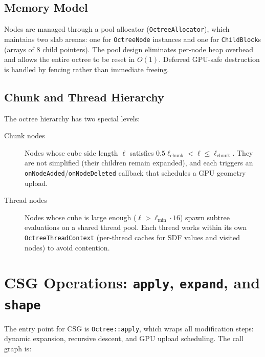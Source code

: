 \documentclass[10pt,a4paper]{article}
\begin{document}
\subsection{Memory Model}

Nodes are managed through a pool allocator (\lstinline{OctreeAllocator}),
which maintains two slab arenas: one for \lstinline{OctreeNode} instances
and one for \lstinline{ChildBlock}s (arrays of 8 child pointers).
The pool design eliminates per-node heap overhead and allows the entire
octree to be reset in $O(1)$.  Deferred GPU-safe destruction is handled
by fencing rather than immediate freeing.

\subsection{Chunk and Thread Hierarchy}

The octree hierarchy has two special levels:
\begin{description}
  \item[Chunk nodes] Nodes whose cube side length $\ell$ satisfies
    $0.5\ell_{\mathrm{chunk}} < \ell \leq \ell_{\mathrm{chunk}}$.
    They are not simplified (their children remain expanded), and each
    triggers an \lstinline{onNodeAdded}/\lstinline{onNodeDeleted}
    callback that schedules a GPU geometry upload.
  \item[Thread nodes] Nodes whose cube is large enough
    ($\ell > \ell_{\min} \cdot 16$) spawn subtree evaluations on a
    shared thread pool.  Each thread works within its own
    \lstinline{OctreeThreadContext} (per-thread caches for SDF values and
    visited nodes) to avoid contention.
\end{description}

\section{CSG Operations: \texttt{apply}, \texttt{expand}, and \texttt{shape}}
\label{sec:shape}

The entry point for CSG is \lstinline{Octree::apply}, which wraps all
modification steps: dynamic expansion, recursive descent, and GPU upload
scheduling.  The call graph is:
\end{document}

